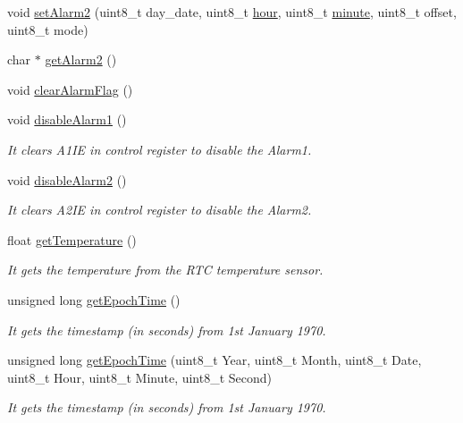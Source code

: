 \begin{DoxyCompactItemize}
\item 
void \hyperlink{class_wasp_r_t_c_a85bd8e721a5fc9afa7e9293b6a41a8d4}{set\+Alarm2} (uint8\+\_\+t day\+\_\+date, uint8\+\_\+t \hyperlink{class_wasp_r_t_c_a0b743dddae720f33e107233086e08e62}{hour}, uint8\+\_\+t \hyperlink{class_wasp_r_t_c_adc5a10810d87d464a49b998936b48839}{minute}, uint8\+\_\+t offset, uint8\+\_\+t mode)
\item 
char $\ast$ \hyperlink{class_wasp_r_t_c_ad555073df7f151ded8e5adf126753487}{get\+Alarm2} ()
\item 
void \hyperlink{class_wasp_r_t_c_ad0c1d992e62d0415368d985bd8312784}{clear\+Alarm\+Flag} ()
\item 
void \hyperlink{class_wasp_r_t_c_a695dc4be8867425210d69e525235b14e}{disable\+Alarm1} ()
\begin{DoxyCompactList}\small\item\em It clears A1\+IE in control register to disable the Alarm1. \end{DoxyCompactList}\item 
void \hyperlink{class_wasp_r_t_c_af408112d40578d6cbe05a7db041f659b}{disable\+Alarm2} ()
\begin{DoxyCompactList}\small\item\em It clears A2\+IE in control register to disable the Alarm2. \end{DoxyCompactList}\item 
float \hyperlink{class_wasp_r_t_c_a648fdee8729a639696baba3873da65ce}{get\+Temperature} ()
\begin{DoxyCompactList}\small\item\em It gets the temperature from the R\+TC temperature sensor. \end{DoxyCompactList}\item 
unsigned long \hyperlink{class_wasp_r_t_c_a5c7acac14ef0ac2781e6e76340e16a78}{get\+Epoch\+Time} ()
\begin{DoxyCompactList}\small\item\em It gets the timestamp (in seconds) from 1st January 1970. \end{DoxyCompactList}\item 
unsigned long \hyperlink{class_wasp_r_t_c_aa8e7d09344004c92301528a846a6fd07}{get\+Epoch\+Time} (uint8\+\_\+t Year, uint8\+\_\+t Month, uint8\+\_\+t Date, uint8\+\_\+t Hour, uint8\+\_\+t Minute, uint8\+\_\+t Second)
\begin{DoxyCompactList}\small\item\em It gets the timestamp (in seconds) from 1st January 1970. \end{DoxyCompactList}\item 

\end{DoxyCompactItemize}
